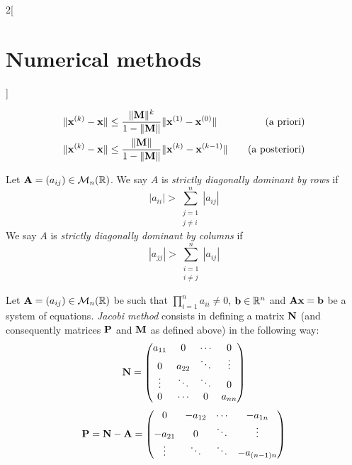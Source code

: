 \documentclass[../../../main.tex]{subfiles}
\begin{document}
\begin{multicols}{2}[\section{Numerical methods}]
\begin{prop}
        \begin{align*}
            \|\vb{x}^{(k)}-\vb{x}\| & \leq\frac{\|\vb{M}\|^k}{1-\|\vb{M}\|}\|\vb{x}^{(1)}-\vb{x}^{(0)}\|\quad & \text{(a priori)}     \\
            \|\vb{x}^{(k)}-\vb{x}\| & \leq\frac{\|\vb{M}\|}{1-\|\vb{M}\|}\|\vb{x}^{(k)}-\vb{x}^{(k-1)}\|\quad & \text{(a posteriori)}
        \end{align*}
    \end{prop}
    \begin{definition}
        Let $\vb{A}=(a_{ij})\in\mathcal{M}_n(\mathbb{R})$. We say $A$ is \textit{strictly diagonally dominant by rows} if $$|a_{ii}|>\sum_{\substack{j=1\\j\ne i}}^n|a_{ij}|$$
        We say $A$ is \textit{strictly diagonally dominant by columns} if $$|a_{jj}|>\sum_{\substack{i=1\\i\ne j}}^n|a_{ij}|$$
    \end{definition}
    \begin{definition}
        Let $\vb{A}=(a_{ij})\in\mathcal{M}_n(\mathbb{R})$ be such that $\prod_{i=1}^na_{ii}\ne 0$, $\vb{b}\in\mathbb{R}^n$ and $\vb{A}\vb{x}=\vb{b}$ be a system of equations. \textit{Jacobi method} consists in defining a matrix $\vb{N}$ (and consequently matrices $\vb{P}$ and $\vb{M}$ as defined above) in the following way:
        \begin{equation*}
            \vb{N}=
            \begin{pmatrix}
                a_{11} & 0      & \cdots & 0      \\
                0      & a_{22} & \ddots & \vdots \\
                \vdots & \ddots & \ddots & 0      \\
                0      & \cdots & 0      & a_{nn}
            \end{pmatrix}
        \end{equation*}
        \begin{equation*}
            \vb{P}=\vb{N}-\vb{A}=
            \begin{pmatrix}
                0       & -a_{12} & \cdots      & -a_{1n}     \\
                -a_{21} & 0       & \ddots      & \vdots      \\
                \vdots  & \ddots  & \ddots      & -a_{(n-1)n} \\

\end{pmatrix}
\end{equation*}
\end{definition}
\end{multicols}
\end{document}
